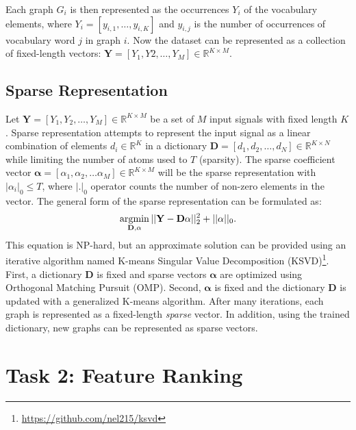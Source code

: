 Each graph $G_i$ is then represented as the occurrences $Y_i$ of the vocabulary elements, where $Y_i = [y_{i,1}, \dots , y_{i,K}]$ and $y_{i,j}$ is the number of occurrences of vocabulary word $j$ in graph $i$. Now the dataset can be represented as a collection of fixed-length vectors: $\mathbf{Y} = [Y_1, Y2, \dots , Y_M] \in \mathbb{R}^{K \times M}$.


\subsection{Sparse Representation}

Let $\mathbf{Y} = [Y_1, Y_2, \dots, Y_M] \in \mathbb{R}^{K \times M}$ be a set of $M$ input signals with fixed length $K$. Sparse representation attempts to represent the input signal as a linear combination of elements $d_i \in \mathbb{R}^{K}$ in a dictionary $\mathbf{D} = [d_1, d_2, \dots , d_N] \in \mathbb{R}^{K \times N}$ while limiting the number of atoms used to $T$ (sparsity). The sparse coefficient vector $\mathbf{\alpha} = [\alpha_1, \alpha_2, \dots \alpha_M] \in \mathbb{R}^{K \times M}$ will be the sparse representation with $|\alpha_i|_0 \leq T$, where $|.|_0$ operator counts the number of non-zero elements in the vector. The general form of the sparse representation can be formulated as:
\begin{align}
\label{eqn: SR}
    \operatorname*{argmin}_{\mathbf{D}, \mathbf{\alpha}} || \mathbf{Y} - \mathbf{D\alpha}||_2^2 + ||\mathbf{\alpha}||_0.
\end{align}
This equation is NP-hard, but an approximate solution can be provided using an iterative algorithm named K-means Singular Value Decomposition (KSVD)\cite{Aharon2006}\footnote{\url{https://github.com/nel215/ksvd}}. First, a dictionary $\mathbf{D}$ is fixed and sparse vectors $\mathbf{\alpha}$ are optimized using Orthogonal Matching Pursuit (OMP)\cite{Pati1993}. Second, $\mathbf{\alpha}$ is fixed and the dictionary $\mathbf{D}$ is updated with a generalized K-means algorithm. After many iterations, each graph is represented as a fixed-length \emph{sparse} vector. In addition, using the trained dictionary, new graphs can be represented as sparse vectors.


\section{Task 2: Feature Ranking}



